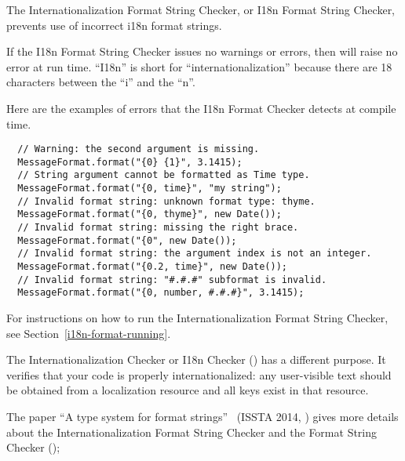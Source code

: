 \htmlhr
{}

The Internationalization Format String Checker, or I18n Format String Checker,
prevents use of incorrect i18n format strings.

If the I18n Format String Checker issues no warnings or errors, then
will raise no error at run time.
``I18n'' is short for
``internationalization'' because there are 18 characters between the ``i'' and
the ``n''.

Here are the examples of errors that the
I18n Format Checker
detects at compile time.

\begin{Verbatim}
  // Warning: the second argument is missing.
  MessageFormat.format("{0} {1}", 3.1415);
  // String argument cannot be formatted as Time type.
  MessageFormat.format("{0, time}", "my string");
  // Invalid format string: unknown format type: thyme.
  MessageFormat.format("{0, thyme}", new Date());
  // Invalid format string: missing the right brace.
  MessageFormat.format("{0", new Date());
  // Invalid format string: the argument index is not an integer.
  MessageFormat.format("{0.2, time}", new Date());
  // Invalid format string: "#.#.#" subformat is invalid.
  MessageFormat.format("{0, number, #.#.#}", 3.1415);
\end{Verbatim}

For instructions on how to run the Internationalization Format String
Checker, see Section~\ref{i18n-format-running}.

The Internationalization Checker or I18n Checker ()
has a different purpose.  It verifies that your code is properly
internationalized: any user-visible text should be obtained from a
localization resource and all keys exist in that resource.

The paper ``A type system for format strings''~\cite{WeitzKSE2014} (ISSTA
2014,
)
gives more details about the Internationalization Format String Checker and the Format
String Checker ();




